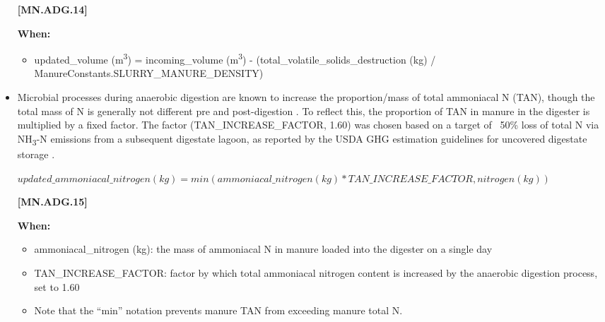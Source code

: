 \begin{refsection}
\begin{itemize}
            {\raggedleft \textbf{[MN.ADG.14]}\par}
            \vspace{0.2cm}
            
        \textbf{When:}
        
        \begin{itemize}
            \item updated\_volume (m\textsuperscript{3}) = incoming\_volume (m\textsuperscript{3}) - (total\_volatile\_solids\_destruction (kg) / ManureConstants.SLURRY\_MANURE\_DENSITY)

        \end{itemize}
        \vspace{0.2cm}

        \item Microbial processes during anaerobic digestion are known to increase the proportion/mass of total ammoniacal N (TAN), though the total mass of N is generally not different pre and post-digestion \parencite{AguirreVillegas2019}. To reflect this, the proportion of TAN in manure in the digester is multiplied by a fixed factor. The factor (TAN\_INCREASE\_FACTOR, 1.60) was chosen based on a target of ~50\% loss of total N via NH\textsubscript{3}-N emissions from a subsequent digestate lagoon, as reported by the USDA GHG estimation guidelines for uncovered digestate storage \parencite{Hanson2024}.
                    \vspace{0.5cm}

        \begin{center}
            \(updated\_ammoniacal\_nitrogen (kg) = min(ammoniacal\_nitrogen (kg) * TAN\_INCREASE\_FACTOR, nitrogen (kg))\)
        \end{center}
        \vspace{0.5cm} 
    
            {\raggedleft \textbf{[MN.ADG.15]}\par}
            \vspace{0.2cm}

        \textbf{When:}
        
        \begin{itemize}
            \item ammoniacal\_nitrogen (kg): the mass of ammoniacal N in manure loaded into the digester on a single day
            \item TAN\_INCREASE\_FACTOR: factor by which total ammoniacal nitrogen content is increased by the anaerobic digestion process, set to 1.60
            \item Note that the “min” notation prevents manure TAN from exceeding manure total N.
        \end{itemize}


\end{itemize}
\end{refsection}
